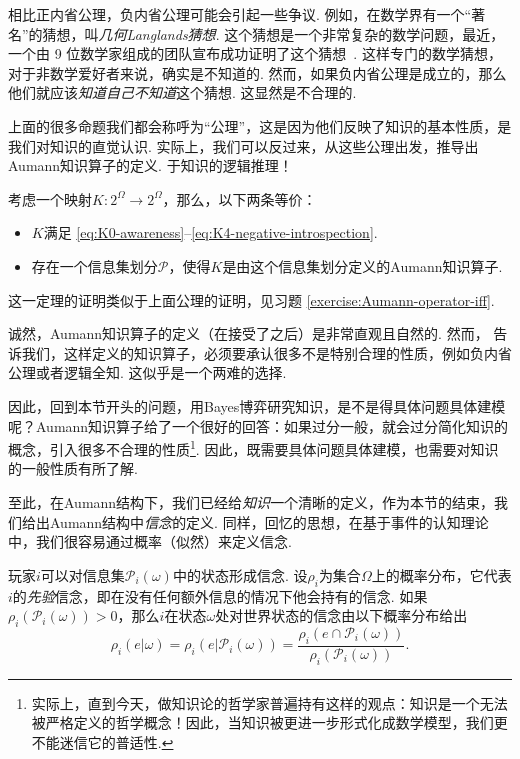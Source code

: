 相比正内省公理，负内省公理可能会引起一些争议. 例如，在数学界有一个“著名”的猜想，叫\textit{几何Langlands猜想}. 这个猜想是一个非常复杂的数学问题，最近，一个由 9 位数学家组成的团队宣布成功证明了这个猜想~\cite{ProofGeometricLanglands}. 这样专门的数学猜想，对于非数学爱好者来说，确实是不知道的. 然而，如果负内省公理是成立的，那么他们就应该\textit{知道自己不知道}这个猜想. 这显然是不合理的.

上面的很多命题我们都会称呼为“公理”，这是因为他们反映了知识的基本性质，是我们对知识的直觉认识. 实际上，我们可以反过来，从这些公理出发，推导出Aumann知识算子的定义. 
于知识的逻辑推理！

\begin{theorem}\label{theorem:Aumann-operator-iff}
考虑一个映射$K:2^\Omega\to 2^\Omega$，那么，以下两条等价：
\begin{itemize}
    \item $K$满足 \eqref{eq:K0-awareness}--\eqref{eq:K4-negative-introspection}.
    \item 存在一个信息集划分$\mathcal P$，使得$K$是由这个信息集划分定义的Aumann知识算子.
\end{itemize}
\end{theorem}

这一定理的证明类似于上面公理的证明，见习题 \ref{exercise:Aumann-operator-iff}.

诚然，Aumann知识算子的定义（在接受了之后）是非常直观且自然的. 然而， 告诉我们，这样定义的知识算子，必须要承认很多不是特别合理的性质，例如负内省公理或者逻辑全知. 这似乎是一个两难的选择. 

因此，回到本节开头的问题，用Bayes博弈研究知识，是不是得具体问题具体建模呢？Aumann知识算子给了一个很好的回答：如果过分一般，就会过分简化知识的概念，引入很多不合理的性质\footnote{实际上，直到今天，做知识论的哲学家普遍持有这样的观点：知识是一个无法被严格定义的哲学概念！因此，当知识被更进一步形式化成数学模型，我们更不能迷信它的普适性.}. 因此，既需要具体问题具体建模，也需要对知识的一般性质有所了解.

至此，在Aumann结构下，我们已经给\textit{知识}一个清晰的定义，作为本节的结束，我们给出Aumann结构中\textit{信念}的定义. 同样，回忆的思想，在基于事件的认知理论中，我们很容易通过概率（似然）来定义信念. 

玩家$i$可以对信息集$\mathcal P_i(\omega)$中的状态形成信念. 设$\rho_i$为集合$\Omega$上的概率分布，它代表$i$的\textit{先验}信念，即在没有任何额外信息的情况下他会持有的信念. 如果$\rho_i(\mathcal P_i(\omega)) > 0$，那么$i$在状态$\omega$处对世界状态的信念由以下概率分布给出
\[\rho_i(e|\omega)=\rho_i(e|\mathcal P_i(\omega)) = \frac{\rho_i(e\cap\mathcal P_i(\omega))}{\rho_i(\mathcal P_i(\omega))}.\]

